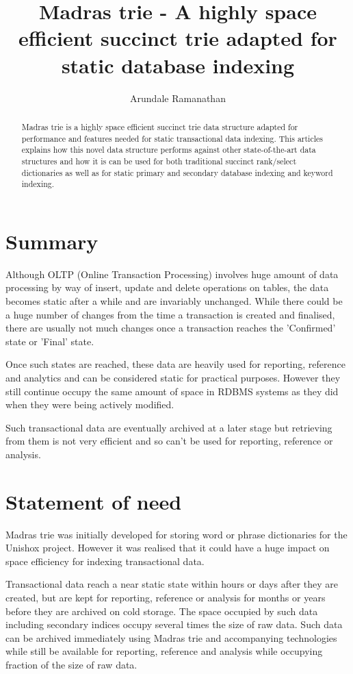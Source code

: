 \documentclass[]{article}
\title{Madras trie - A highly space efficient succinct trie adapted for static database indexing}
\author{Arundale Ramanathan}
\begin{document}
	
	\maketitle
	
	\begin{abstract}
		Madras trie is a highly space efficient succinct trie data structure adapted for performance and features needed for static transactional data indexing.  This articles explains how this novel data structure performs against other state-of-the-art data structures and how it is can be used for both traditional succinct rank/select dictionaries as well as for static primary and secondary database indexing and keyword indexing.

	\end{abstract}

	\section{Summary}

	Although OLTP (Online Transaction Processing) involves huge amount of data processing by way of insert, update and delete operations on tables, the data becomes static after a while and are invariably unchanged.  While there could be a huge number of changes from the time a transaction is created and finalised, there are usually not much changes once a transaction reaches the 'Confirmed' state or 'Final' state.

	Once such states are reached, these data are heavily used for reporting, reference and analytics and can be considered static for practical purposes.  However they still continue occupy the same amount of space in RDBMS systems as they did when they were being actively modified.

	Such transactional data are eventually archived at a later stage but retrieving from them is not very efficient and so can't be used for reporting, reference or analysis.

	\section{Statement of need}

	Madras trie was initially developed for storing word or phrase dictionaries for the Unishox project.  However it was realised that it could have a huge impact on space efficiency for indexing transactional data.

	Transactional data reach a near static state within hours or days after they are created, but are kept for reporting, reference or analysis for months or years before they are archived on cold storage.  The space occupied by such data including secondary indices occupy several times the size of raw data.  Such data can be archived immediately using Madras trie and accompanying technologies while still be available for reporting, reference and analysis while occupying fraction of the size of raw data.
\end{document}
